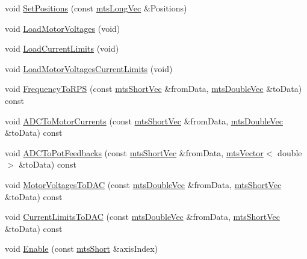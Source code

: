 \begin{DoxyCompactItemize}
\item 
void \hyperlink{classmts_lo_po_mo_co_ab1a20245e2e28f323973a9adf382c21f}{Set\-Positions} (const \hyperlink{mts_vector_8h_a3e011934ab1b5774f640a7bb70d9a672}{mts\-Long\-Vec} \&Positions)
\item 
void \hyperlink{classmts_lo_po_mo_co_a4c21cfc643adfa5b3df7db0d58b3a6a6}{Load\-Motor\-Voltages} (void)
\item 
void \hyperlink{classmts_lo_po_mo_co_a79ad0f5da6232c6359f2599f1f0d8335}{Load\-Current\-Limits} (void)
\item 
void \hyperlink{classmts_lo_po_mo_co_a47e5897e8beeb300c28046e4f5039864}{Load\-Motor\-Voltages\-Current\-Limits} (void)
\item 
void \hyperlink{classmts_lo_po_mo_co_a0b82596365920aba765d3fc04b929213}{Frequency\-To\-R\-P\-S} (const \hyperlink{mts_vector_8h_a70974166b1900882680f3002b69e11c5}{mts\-Short\-Vec} \&from\-Data, \hyperlink{mts_vector_8h_af69167a5dc2ad33eb93965b9387d8403}{mts\-Double\-Vec} \&to\-Data) const 
\item 
void \hyperlink{classmts_lo_po_mo_co_a3bb745819b0680a4a69119a121c358aa}{A\-D\-C\-To\-Motor\-Currents} (const \hyperlink{mts_vector_8h_a70974166b1900882680f3002b69e11c5}{mts\-Short\-Vec} \&from\-Data, \hyperlink{mts_vector_8h_af69167a5dc2ad33eb93965b9387d8403}{mts\-Double\-Vec} \&to\-Data) const 
\item 
void \hyperlink{classmts_lo_po_mo_co_a2a17c6e795d560987ae632aa6f141be5}{A\-D\-C\-To\-Pot\-Feedbacks} (const \hyperlink{mts_vector_8h_a70974166b1900882680f3002b69e11c5}{mts\-Short\-Vec} \&from\-Data, \hyperlink{classmts_vector}{mts\-Vector}$<$ double $>$ \&to\-Data) const 
\item 
void \hyperlink{classmts_lo_po_mo_co_a22c839b12f2c4d0877a2aa9e34784494}{Motor\-Voltages\-To\-D\-A\-C} (const \hyperlink{mts_vector_8h_af69167a5dc2ad33eb93965b9387d8403}{mts\-Double\-Vec} \&from\-Data, \hyperlink{mts_vector_8h_a70974166b1900882680f3002b69e11c5}{mts\-Short\-Vec} \&to\-Data) const 
\item 
void \hyperlink{classmts_lo_po_mo_co_a1b4780a38e6efbcdb6b80f2d8f9deae3}{Current\-Limits\-To\-D\-A\-C} (const \hyperlink{mts_vector_8h_af69167a5dc2ad33eb93965b9387d8403}{mts\-Double\-Vec} \&from\-Data, \hyperlink{mts_vector_8h_a70974166b1900882680f3002b69e11c5}{mts\-Short\-Vec} \&to\-Data) const 
\item 
void \hyperlink{classmts_lo_po_mo_co_a541a2df206472d07a224eedef7b8f201}{Enable} (const \hyperlink{mts_generic_object_proxy_8h_a169c76d3ebc9c8cf6c47d54425dc5097}{mts\-Short} \&axis\-Index)

\end{DoxyCompactItemize}
